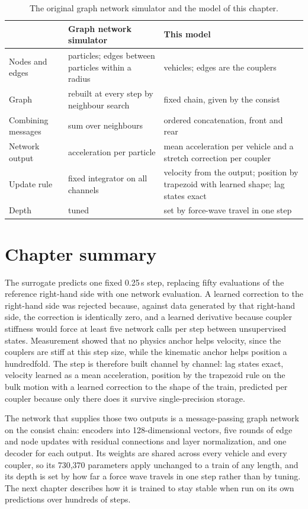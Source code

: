 \begin{table}[htbp]
    \centering
    \begin{tabular}{p{3.0cm}p{5.2cm}p{5.8cm}}
        \toprule
         & Graph network simulator \cite{sanchez2020gns} & This model \\
        \midrule
        Nodes and edges & particles; edges between particles within a radius & vehicles; edges are the couplers \\
        Graph & rebuilt at every step by neighbour search & fixed chain, given by the consist \\
        Combining messages & sum over neighbours & ordered concatenation, front and rear \\
        Network output & acceleration per particle & mean acceleration per vehicle and a stretch correction per coupler \\
        Update rule & fixed integrator on all channels & velocity from the output; position by trapezoid with learned shape; lag states exact \\
        Depth & tuned & set by force-wave travel in one step \\
        \bottomrule
    \end{tabular}
    \caption{The original graph network simulator and the model of this chapter.}
    \label{tab:arch_gns_comparison}
\end{table}

\section{Chapter summary}

The surrogate predicts one fixed 0.25\,s step, replacing fifty evaluations of the reference right-hand side with one network evaluation. A learned correction to the right-hand side was rejected because, against data generated by that right-hand side, the correction is identically zero, and a learned derivative because coupler stiffness would force at least five network calls per step between unsupervised states. Measurement showed that no physics anchor helps velocity, since the couplers are stiff at this step size, while the kinematic anchor helps position a hundredfold. The step is therefore built channel by channel: lag states exact, velocity learned as a mean acceleration, position by the trapezoid rule on the bulk motion with a learned correction to the shape of the train, predicted per coupler because only there does it survive single-precision storage.

The network that supplies those two outputs is a message-passing graph network on the consist chain: encoders into 128-dimensional vectors, five rounds of edge and node updates with residual connections and layer normalization, and one decoder for each output. Its weights are shared across every vehicle and every coupler, so its 730,370 parameters apply unchanged to a train of any length, and its depth is set by how far a force wave travels in one step rather than by tuning. The next chapter describes how it is trained to stay stable when run on its own predictions over hundreds of steps.
